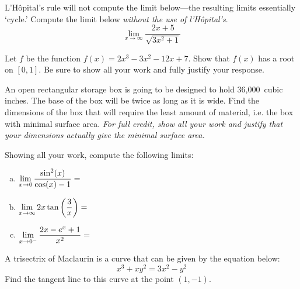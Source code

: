 \documentclass[12pt,letterpaper]{exam}
\begin{document}
\examtitle
{} 
\scores
\bottomline
\newpage


\begin{questions}

\newpage
\question[10] L'H\^{o}pital's rule will not compute the limit below---the resulting limits essentially `cycle.' Compute the limit below {\itshape without the use of l'H\^{o}pital's}.
	\[
	\lim_{x \to \infty} \dfrac{2x + 5}{\sqrt{3x^2 + 1}}
	\]



\newpage
\question[10] Let $f$ be the function $f(x)= 2x^3 - 3x^2 - 12x + 7$. Show that $f(x)$ has a root on $[0, 1]$. Be sure to show all your work and fully justify your response. 



\newpage
\question[10] An open rectangular storage box is going to be designed to hold 36,000~cubic inches. The base of the box will be twice as long as it is wide. Find the dimensions of the box that will require the least amount of material, i.e. the box with minimal surface area. {\itshape For full credit, show all your work and justify that your dimensions actually give the minimal surface area.}



\newpage
\question[10] Showing all your work, compute the following limits: \par\vspace{0.3cm}
	\begin{enumerate}[(a)]
	\item $\displaystyle\lim_{x \to 0} \dfrac{\sin^2(x)}{\cos(x) - 1}=$ \vfill
	\item $\displaystyle\lim_{x \to \infty} 2x \tan\left( \dfrac{3}{x} \right)=$ \vfill
	\item $\displaystyle\lim_{x \to 0^-} \dfrac{2x - e^x + 1}{x^2}=$ \vfill
	\end{enumerate}



\newpage
\question[10] A trisectrix of Maclaurin is a curve that can be given by the equation below:
	\[
	x^3 + xy^2= 3x^2 - y^2
	\] 
Find the tangent line to this curve at the point $(1, -1)$.




\end{questions}
\end{document}
